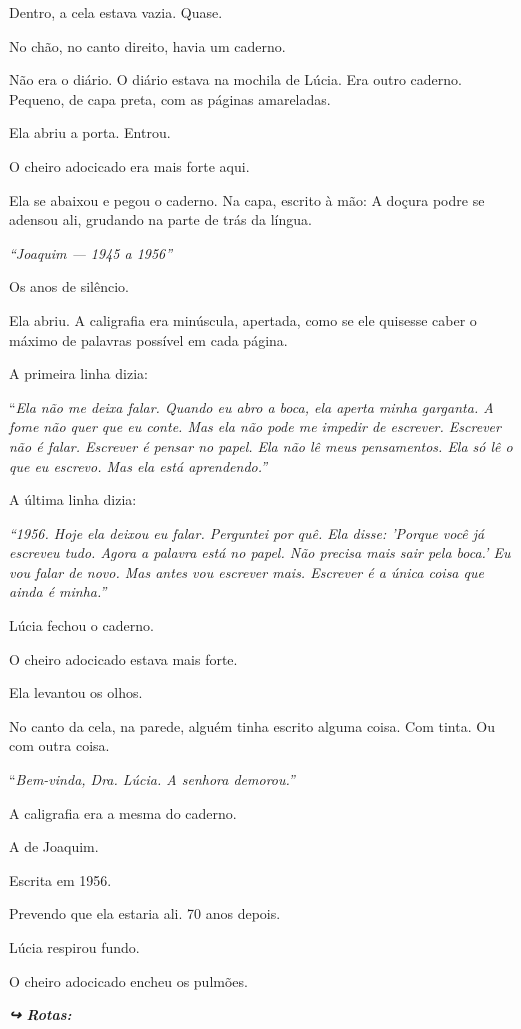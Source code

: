\noindent Dentro, a cela estava vazia.
Quase.

\noindent No chão, no canto direito, havia um caderno.

\noindent Não era o diário. O diário estava na mochila de Lúcia. Era outro caderno. Pequeno, de capa preta, com as páginas amareladas.

\noindent Ela abriu a porta. Entrou.

\noindent O cheiro adocicado era mais forte aqui.

\noindent Ela se abaixou e pegou o caderno. Na capa, escrito à mão:
\noindent A doçura podre se adensou ali, grudando na parte de trás da língua.

\noindent \textit{\textquotedblleft{}Joaquim --- 1945 a 1956\textquotedblright{}}

\noindent Os anos de silêncio.

\noindent Ela abriu. A caligrafia era minúscula, apertada, como se ele quisesse caber o máximo de palavras possível em cada página.

\noindent A primeira linha dizia:

\noindent \textquotedblleft{\textit{Ela não me deixa falar. Quando eu abro a boca, ela aperta minha garganta. A fome não quer que eu conte. Mas ela não pode me impedir de escrever. Escrever não é falar. Escrever é pensar no papel. Ela não lê meus pensamentos. Ela só lê o que eu escrevo. Mas ela está aprendendo.\textquotedblright{}}}

\noindent A última linha dizia:

\noindent \textit{\textquotedblleft{}1956. Hoje ela deixou eu falar. Perguntei por quê. Ela disse: 'Porque você já escreveu tudo. Agora a palavra está no papel. Não precisa mais sair pela boca.' Eu vou falar de novo. Mas antes vou escrever mais. Escrever é a única coisa que ainda é minha.\textquotedblright{}}

\noindent Lúcia fechou o caderno.

\noindent O cheiro adocicado estava mais forte.

\noindent Ela levantou os olhos.

\noindent No canto da cela, na parede, alguém tinha escrito alguma coisa. Com tinta. Ou com outra coisa.

\noindent \textquotedblleft{\textit{Bem-vinda, Dra. Lúcia. A senhora demorou.\textquotedblright{}}}

\noindent A caligrafia era a mesma do caderno.

\noindent A de Joaquim.

\noindent Escrita em 1956.

\noindent Prevendo que ela estaria ali. 70 anos depois.

\noindent Lúcia respirou fundo.

\noindent O cheiro adocicado encheu os pulmões.

\vspace{0.5em}
\noindent\textit{\textbf{↪ Rotas:}  \rotasep {}}